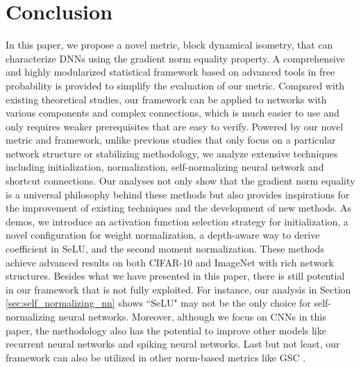 \documentclass[10pt,journal,compsoc]{IEEEtran}
\begin{document}
\section{Conclusion}
In this paper, we propose a novel metric, block dynamical isometry, that can characterize DNNs using the gradient norm equality property. A comprehensive and highly modularized statistical framework based on advanced tools in free probability is provided to simplify the evaluation of our metric. Compared with existing theoretical studies, our framework can be applied to networks with various components and complex connections, which is much easier to use and only requires weaker prerequisites that are easy to verify. Powered by our novel metric and framework, unlike previous studies that only focus on a particular network structure or stabilizing methodology, we analyze extensive techniques including initialization, normalization, self-normalizing neural network and shortcut connections. Our analyses not only show that the gradient norm equality is a universal philosophy behind these methods but also provides inspirations for the improvement of existing techniques and the development of new methods. As demos, we introduce an activation function selection strategy for initialization, a novel configuration for weight normalization, a depth-aware way to derive coefficient in SeLU, and the second moment normalization. These methods achieve advanced results on both CIFAR-10 and ImageNet with rich network structures. Besides what we have presented in this paper, there is still potential in our framework that is not fully exploited. For instance, our analysis in Section \ref{sec:self_normalizing_nn} shows ``SeLU" may not be the only choice for self-normalizing neural networks. Moreover, although we focus on CNNs in this paper, the methodology also has the potential to improve other models like recurrent neural networks and spiking neural networks. Last but not least, our framework can also be utilized in other norm-based metrics like GSC \cite{philipp2018gradients}.
 
\end{document}
